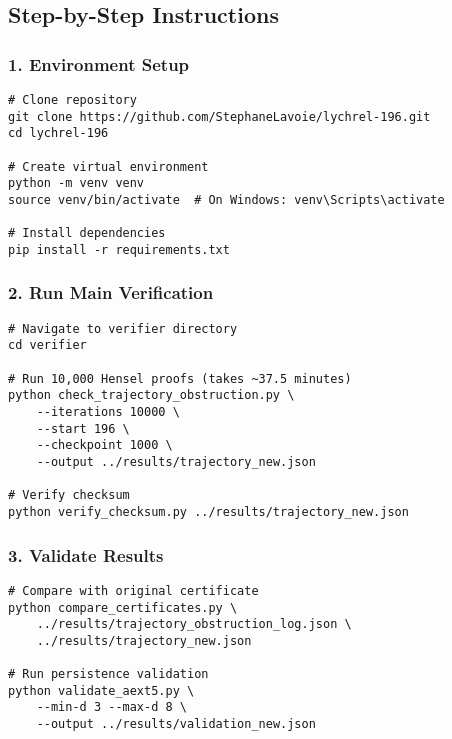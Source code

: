 \documentclass[11pt,a4paper]{article}
\begin{document}
\subsection{Step-by-Step Instructions}

\subsubsection{1. Environment Setup}

\begin{lstlisting}[style=bashstyle, caption={Setting Up Environment}]
# Clone repository
git clone https://github.com/StephaneLavoie/lychrel-196.git
cd lychrel-196

# Create virtual environment
python -m venv venv
source venv/bin/activate  # On Windows: venv\Scripts\activate

# Install dependencies
pip install -r requirements.txt
\end{lstlisting}

\subsubsection{2. Run Main Verification}

\begin{lstlisting}[style=bashstyle, caption={Running Main Verification}]
# Navigate to verifier directory
cd verifier

# Run 10,000 Hensel proofs (takes ~37.5 minutes)
python check_trajectory_obstruction.py \
    --iterations 10000 \
    --start 196 \
    --checkpoint 1000 \
    --output ../results/trajectory_new.json

# Verify checksum
python verify_checksum.py ../results/trajectory_new.json
\end{lstlisting}

\subsubsection{3. Validate Results}

\begin{lstlisting}[style=bashstyle, caption={Validating Results}]
# Compare with original certificate
python compare_certificates.py \
    ../results/trajectory_obstruction_log.json \
    ../results/trajectory_new.json

# Run persistence validation
python validate_aext5.py \
    --min-d 3 --max-d 8 \
    --output ../results/validation_new.json
\end{lstlisting}
\end{document}

